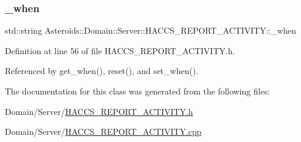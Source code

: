 \subsubsection{\texorpdfstring{\+\_\+when}{\_when}}
{\footnotesize\ttfamily std\+::string Asteroids\+::\+Domain\+::\+Server\+::\+H\+A\+C\+C\+S\+\_\+\+R\+E\+P\+O\+R\+T\+\_\+\+A\+C\+T\+I\+V\+I\+T\+Y\+::\+\_\+when\hspace{0.3cm}{\ttfamily [private]}}



Definition at line 56 of file H\+A\+C\+C\+S\+\_\+\+R\+E\+P\+O\+R\+T\+\_\+\+A\+C\+T\+I\+V\+I\+T\+Y.\+h.



Referenced by get\+\_\+when(), reset(), and set\+\_\+when().



The documentation for this class was generated from the following files\+:\begin{DoxyCompactItemize}
\item 
Domain/\+Server/\hyperlink{HACCS__REPORT__ACTIVITY_8h}{H\+A\+C\+C\+S\+\_\+\+R\+E\+P\+O\+R\+T\+\_\+\+A\+C\+T\+I\+V\+I\+T\+Y.\+h}\item 
Domain/\+Server/\hyperlink{HACCS__REPORT__ACTIVITY_8cpp}{H\+A\+C\+C\+S\+\_\+\+R\+E\+P\+O\+R\+T\+\_\+\+A\+C\+T\+I\+V\+I\+T\+Y.\+cpp}\end{DoxyCompactItemize}
